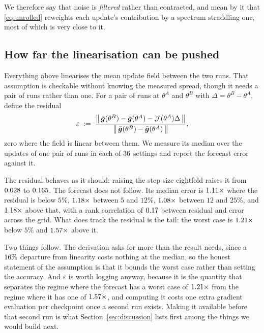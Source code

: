 We therefore say that noise is \emph{filtered} rather than contracted, and mean by it that
\eqref{eq:unrolled} reweights each update's contribution by a spectrum straddling one, most of
which is very close to it.

\subsection{How far the linearisation can be pushed}
\label{sec:exp-linearity}

Everything above linearises the mean update field between the two runs. That assumption is
checkable without knowing the measured spread, though it needs a pair of runs rather than one. For a
pair of runs at $\theta^A$ and $\theta^B$ with $\Delta = \theta^B - \theta^A$, define the residual
\begin{equation}
  \label{eq:residual}
  \varepsilon \;:=\;
  \frac{\big\|\,\bar{\bm{g}}(\theta^B) - \bar{\bm{g}}(\theta^A) - \mathcal{J}(\theta^A)\Delta\,\big\|}
       {\big\|\,\bar{\bm{g}}(\theta^B) - \bar{\bm{g}}(\theta^A)\,\big\|},
\end{equation}
zero where the field is linear between them. We measure its median over the updates of one pair of runs in each of $36$ settings and
report the forecast error against it.

The residual behaves as it should: raising the step size eightfold raises it from
$0.028$ to $0.165$. The forecast does not follow. Its median
error is $1.11\times$ where the residual is below $5\%$, $1.18\times$
between $5$ and $12\%$, $1.08\times$ between $12$ and $25\%$, and
$1.18\times$ above that, with a rank correlation of $0.17$ between
residual and error across the grid. What does track the residual is the tail: the worst case is
$1.21\times$ below $5\%$ and $1.57\times$ above it.

Two things follow. The derivation asks for more than the result needs, since a $16\%$ departure
from linearity costs nothing at the median, so the honest statement of the assumption is that it
bounds the worst case rather than setting the accuracy. And $\varepsilon$ is worth logging anyway,
because it is the quantity that separates the regime where the forecast has a worst case of
$1.21\times$ from the regime where it has one of $1.57\times$, and computing it costs one extra
gradient evaluation per checkpoint once a second run exists. Making it available before that
second run is what Section~\ref{sec:discussion} lists first among the things we would build next.

